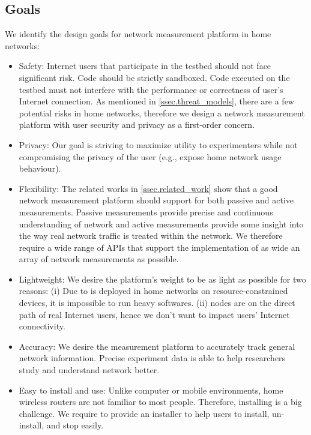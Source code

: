 \subsection{Goals}
\label{ssec.goals}
We identify the design goals for network measurement platform in home 
networks:
\begin{itemize}
\item Safety: Internet users that participate in the testbed should not face significant risk. Code should be strictly sandboxed. Code executed on the testbed must not interfere with the performance or correctness of user's Internet connection. As mentioned in \ref{ssec.threat_models}, there are a few potential risks in home networks, therefore we design a network measurement platform with user security and privacy as a first-order concern.

\item Privacy: Our goal is striving to maximize utility to experimenters while not compromising the privacy of the user (e.g., expose home network usage behaviour).

\item Flexibility: The related works in \ref{ssec.related_work} show that a good network measurement platform should support for both passive and active measurements. Passive measurements provide precise and continuous understanding of network and active measurements provide some insight into the way real network traffic is treated within the network. We therefore require a wide range of APIs that support the implementation of as wide an array of network measurements as possible.

\item Lightweight: We desire the platform's weight to be as light as possible for two reasons: (i) Due to \sysname is deployed in home networks on resource-constrained devices, it is impossible to run heavy softwares. (ii) \sysname nodes are on the direct path of real Internet users, hence we don't want to impact users' Internet connectivity.

\item Accuracy: We desire the measurement platform to accurately track 
general network information. Precise experiment data is able to help researchers study and understand network better.

\item Easy to install and use: Unlike computer or mobile environments, home wireless routers are not familiar to most people. Therefore, installing is a big challenge. We require to provide an installer to help users to install, un-install, and stop easily.
\end{itemize}

